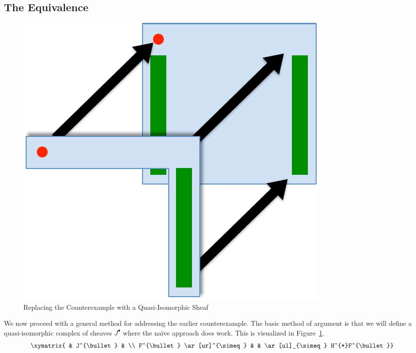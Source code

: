\subsection{The Equivalence}\label{subsec:graded_equivalence}

\begin{figure}
\centering
\includegraphics[width=.7\textwidth]{bar_replace.pdf}
\caption{Replacing the Counterexample with a Quasi-Isomorphic Sheaf}
\label{fig:bar_replace}
\end{figure}

We now proceed with a general method for addressing the earlier counterexample. The basic method of argument is that we will define a quasi-isomorphic complex of sheaves $J^{\bullet}$ where the na\"ive approach does work. This is visualized in Figure~\ref{fig:bar_replace}.
\[
\xymatrix{ & J^{\bullet} & \\
F^{\bullet} \ar[ur]^{\simeq} & & \ar[ul]_{\simeq} H^{*}F^{\bullet}}
\]

